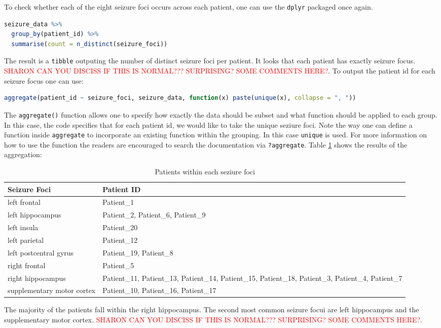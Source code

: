 To check whether each of the eight seizure foci occurs across each patient, one can use the \verb|dplyr| packaged once again.
\begin{lstlisting}[language=R]
seizure_data %>%
  group_by(patient_id) %>%
  summarise(count = n_distinct(seizure_foci))
\end{lstlisting}
The result is a \verb|tibble| outputing the number of distinct seizure foci per patient. It looks that each patient has exactly seizure focus.  \textcolor{red}{SHARON CAN YOU DISCISS IF THIS IS NORMAL??? SURPRISING? SOME COMMENTS HERE?}.
To output the patient id for each seizure focus one can use:
\begin{lstlisting}[language=R]
aggregate(patient_id ~ seizure_foci, seizure_data, function(x) paste(unique(x), collapse = ", "))
\end{lstlisting}
The \verb|aggregate()| function allows one to specify how exactly the data should be subset and what function should be applied to each group. In this case, the code specifies that for each patient id, we would like to take the unique seziure foci. Note the way one can define a function inside \verb|aggregate| to incorporate an existing function within the grouping. In this case \verb|unique| is used. For more information on how to use the function the readers are encouraged to search the documentation via \verb|?aggregate|. Table \ref{tab:seizure_foci} shows the results of the aggregation:
\begin{table}[ht]
\centering
\begin{tabularx}{\textwidth}{|l|X|}
\hline
Seizure Foci                   & Patient ID \\ \hline
left frontal                   & Patient\_1 \\ \hline
left hippocampus               & Patient\_2, Patient\_6, Patient\_9 \\ \hline
left insula                    & Patient\_20 \\ \hline
left parietal                  & Patient\_12 \\ \hline
left postcentral gyrus         & Patient\_19, Patient\_8 \\ \hline
right frontal                  & Patient\_5 \\ \hline
right hippocampus              & Patient\_11, Patient\_13, Patient\_14, Patient\_15, Patient\_18, Patient\_3, Patient\_4, Patient\_7 \\ \hline
supplementary motor cortex     & Patient\_10, Patient\_16, Patient\_17 \\ \hline
\end{tabularx}
\caption{Patients within each seziure foci}
\label{tab:seizure_foci}
\end{table}
The majority of the patients fall within the right hippocampus. The second most common seizure focui are left hippocampus and the supplementary motor cortex. \textcolor{red}{SHARON CAN YOU DISCISS IF THIS IS NORMAL??? SURPRISING? SOME COMMENTS HERE?}.

